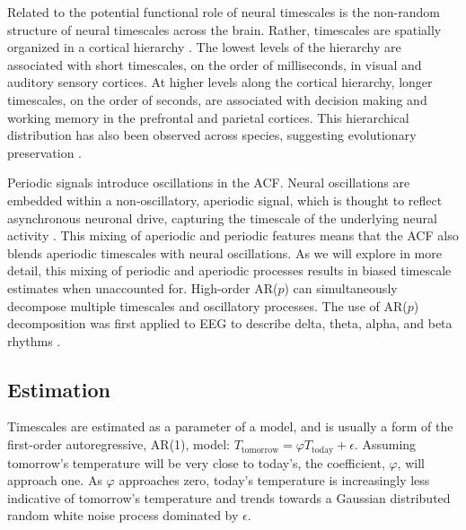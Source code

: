 \documentclass[pdflatex,lineno,sn-nature]{sn-jnl}
\theoremstyle{thmstyleone}
\theoremstyle{thmstyletwo}
\theoremstyle{thmstylethree}
\begin{document}
Related to the potential functional role of neural timescales is the non-random structure of neural timescales across the brain. Rather, timescales are spatially organized in a cortical hierarchy \cite{hasson_hierarchy_2008, kiebel_hierarchy_2008, murray_hierarchy_2014, gao_neuronal_2020, misic_brain_2010, raut_organization_2020}. The lowest levels of the hierarchy are associated with short timescales, on the order of milliseconds, in visual \cite{buracas_efficient_1998} and auditory \cite{yang_millisecond-scale_2008} sensory cortices. At higher levels along the cortical hierarchy, longer timescales, on the order of seconds, are associated with decision making \cite{brody_timing_2003} and working memory \cite{wang_probabilistic_2002} in the prefrontal and parietal cortices. This hierarchical distribution has also been observed across species, suggesting evolutionary preservation \cite{buzsaki_scaling_2013}.

Periodic signals introduce oscillations in the ACF. Neural oscillations are embedded within a non-oscillatory, aperiodic signal, which is thought to reflect asynchronous neuronal drive, capturing the timescale of the underlying neural activity \cite{gao_neuronal_2020}. This mixing of aperiodic and periodic features means that the ACF also blends aperiodic timescales with neural oscillations. As we will explore in more detail, this mixing of periodic and aperiodic processes results in biased timescale estimates when unaccounted for. High-order AR($p$) can simultaneously decompose multiple timescales and oscillatory processes. The use of AR($p$) decomposition was first applied to EEG to describe delta, theta, alpha, and beta rhythms \cite{Sato1977}.

\subsection{Estimation}\label{sec:estimation}

Timescales are estimated as a parameter of a model, and is usually a form of the first-order autoregressive, AR(1), model: $T_{\text{tomorrow}} = \varphi T_{\text{today}} + \epsilon$. Assuming tomorrow's temperature will be very close to today's, the coefficient, $\varphi$, will approach one. As $\varphi$ approaches zero, today's temperature is increasingly less indicative of tomorrow's temperature and trends towards a Gaussian distributed random white noise process dominated by $\epsilon$.
\end{document}
